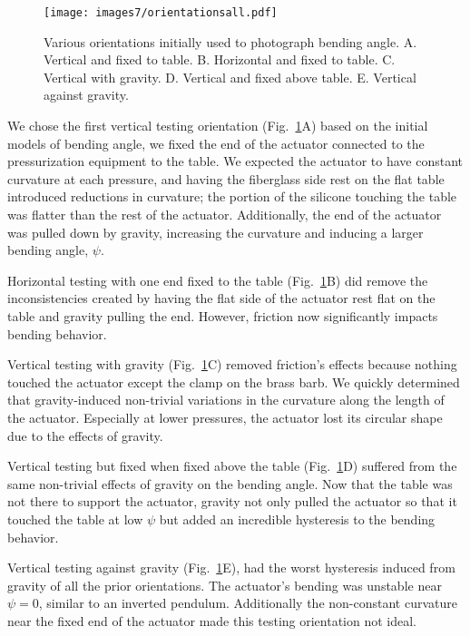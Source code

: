 \begin{figure}[!ht]
    \centering
    \texttt{[image: images7/orientationsall.pdf]}
    \caption{Various orientations initially used to photograph bending angle.  A. Vertical and fixed to table. B. Horizontal and fixed to table. C. Vertical with gravity. D. Vertical and fixed above table. E. Vertical against gravity.}
    \label{fig:orientationsall}
\end{figure}

We chose the first vertical testing orientation (Fig.~\ref{fig:orientationsall}A) based on the initial models of bending angle, we fixed the end of the actuator connected to the pressurization equipment to the table. We expected the actuator to have constant curvature at each pressure, and having the fiberglass side rest on the flat table introduced reductions in curvature; the portion of the silicone touching the table was flatter than the rest of the actuator. Additionally, the end of the actuator was pulled down by gravity, increasing the curvature and inducing a larger bending angle, $\psi$. 

Horizontal testing with one end fixed to the table (Fig.~\ref{fig:orientationsall}B) did remove the inconsistencies created by having the flat side of the actuator rest flat on the table and gravity pulling the end. However, friction now significantly impacts bending behavior. 

Vertical testing with gravity (Fig.~\ref{fig:orientationsall}C) removed friction's effects because nothing touched the actuator except the clamp on the brass barb. We quickly determined that gravity-induced non-trivial variations in the curvature along the length of the actuator. Especially at lower pressures, the actuator lost its circular shape due to the effects of gravity. 

Vertical testing but fixed when fixed above the table (Fig.~\ref{fig:orientationsall}D) suffered from the same non-trivial effects of gravity on the bending angle. Now that the table was not there to support the actuator, gravity not only pulled the actuator so that it touched the table at low $\psi$ but added an incredible hysteresis to the bending behavior. 

Vertical testing against gravity (Fig.~\ref{fig:orientationsall}E), had the worst hysteresis induced from gravity of all the prior orientations. The actuator's bending was unstable near $\psi=0$, similar to an inverted pendulum. Additionally the non-constant curvature near the fixed end of the actuator made this testing orientation not ideal. 

